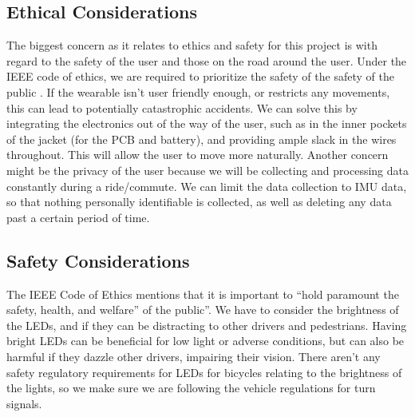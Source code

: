 \documentclass[12pt]{article}
\begin{document}
\subsection{Ethical Considerations}
The biggest concern as it relates to ethics and safety for 
this project is with regard to the safety of the user and 
those on the road around the user. Under the IEEE code of 
ethics, we are required to prioritize the safety of the 
safety of the public \cite{IEEEethics2024}. If the wearable isn’t user
friendly enough, or restricts any movements, this can lead 
to potentially catastrophic accidents. We can solve this by 
integrating the electronics out of the way of the user, 
such as in the inner pockets of the jacket (for the PCB 
and battery), and providing ample slack in the wires 
throughout. This will allow the user to move more naturally.
Another concern might be the privacy of the user \cite{IEEEethics2024}
because we will be collecting and processing data constantly 
during a ride/commute. We can limit the data collection to 
IMU data, so that nothing personally identifiable is
collected, as well as deleting any data past a certain 
period of time. 




\subsection{Safety Considerations}
The IEEE Code of Ethics mentions that it is important
to “hold paramount the safety, health, and welfare” of 
the public”. \cite{IEEEethics2024}
We have to consider the brightness of the LEDs, 
and if they can be distracting to other drivers and 
pedestrians. Having bright LEDs can be beneficial for 
low light or adverse conditions, but can also be harmful 
if they dazzle other drivers, impairing their vision. 
There aren’t any safety regulatory requirements for 
LEDs for bicycles relating to the brightness of the 
lights, so we make sure we are following the vehicle 
regulations for turn signals. \cite{CFR571_108} 


\newpage

\end{document}
